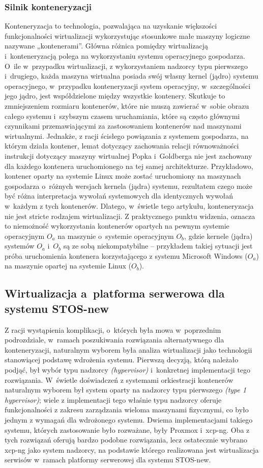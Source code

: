 \subsubsection{Silnik konteneryzacji}
Konteneryzacja to technologia, pozwalająca na uzyskanie większości funkcjonalności wirtualizacji wykorzystując stosunkowe małe maszyny logiczne nazywane „kontenerami”. Główna różnica pomiędzy wirtualizacją i~konteneryzacją polega na wykorzystaniu systemu operacyjnego gospodarza. O~ile w~przypadku wirtualizacji, z wykorzystaniem nadzorcy typu pierwszego i~drugiego, każda maszyna wirtualna posiada swój własny kernel (jądro) systemu operacyjnego, w~przypadku konteneryzacji system operacyjny, w~szczególności jego jądro, jest współdzielone między wszystkie kontenery. Skutkuje to zmniejszeniem rozmiaru kontenerów, które nie muszą zawierać w~sobie obrazu całego systemu i~szybszym czasem uruchamiania, które są często głównymi czynnikami przemawiającymi za zastosowaniem kontenerów nad maszynami wirtualnymi. Jednakże, z racji ścisłego powiązania z systemem gospodarza, na którym działa kontener, lemat dotyczący zachowania relacji równoważności instrukcji dotyczący maszyny wirtualnej Popka i~Goldberga\cite{virtualization} nie jest zachowany dla każdego kontenera uruchomionego na tej samej architekturze. Przykładowo, kontener oparty na systemie Linux może zostać uruchomiony na maszynach gospodarza o~różnych wersjach kernela (jądra) systemu, rezultatem czego może być różna interpretacja wywołań systemowych dla identycznych wywołań w~każdym z tych kontenerów. Dlatego, w~świetle tego artykułu, konteneryzacja nie jest stricte rodzajem wirtualizacji. Z praktycznego punktu widzenia, oznacza to niemożność wykorzystania kontenerów opartych na pewnym systemie operacyjnym $O_a$ na maszynie o~systemie operacyjnym $O_b$, gdzie kernele (jądra) systemów $O_a$ i~$O_b$ są ze sobą niekompatybilne -- przykładem takiej sytuacji jest próba uruchomienia kontenera korzystającego z systemu Microsoft Windows ($O_a$) na maszynie opartej na systemie Linux ($O_b$).

\subsection{Wirtualizacja a~platforma serwerowa dla systemu STOS-new}
Z racji wystąpienia komplikacji, o~których była mowa w~poprzednim podrozdziale, w~ramach poszukiwania rozwiązania alternatywnego dla konteneryzacji, naturalnym wyborem była analiza wirtualizacji jako technologii stanowiącej podstawę wdrożenia systemu. Pierwszą decyzją, którą należało podjąć, był wybór typu nadzorcy \textit{(hypervisor)} i~konkretnej implementacji tego rozwiązania. W~świetle doświadczeń z systemami orkiestracji kontenerów naturalnym wyborem był system oparty na nadzorcy typu pierwszego \textit{(type 1 hypervisor)}; wiele z implementacji tego właśnie typu nadzorcy oferuje funkcjonalności z zakresu zarządzania wieloma maszynami fizycznymi, co było jednym z wymagań dla wdrożonego systemu. Dwiema implementacjami takiego systemu, których zastosowanie było rozważane, były Proxmox i~xcp-ng\cite{proxmox, xcp}. Oba z tych rozwiązań oferują bardzo podobne rozwiązania, lecz ostatecznie wybrano xcp-ng jako system nadzorcy, na podstawie którego realizowana jest wirtualizacja serwisów w~ramach platformy serwerowej dla systemu STOS-new.
